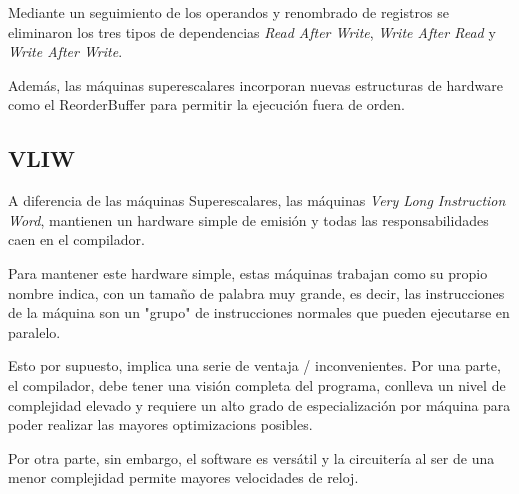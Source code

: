 \bigskip
Mediante un seguimiento de los operandos y renombrado de registros se eliminaron los tres tipos 
de dependencias \textit{Read After Write}, \textit{Write After Read} y \textit{Write After Write}. 

\bigskip
Además, las máquinas superescalares incorporan nuevas estructuras de hardware como el ReorderBuffer para
permitir la ejecución fuera de orden.

\subsection{VLIW}

A diferencia de las máquinas Superescalares, las máquinas \textit{Very Long Instruction Word},
mantienen un hardware simple de emisión y todas las responsabilidades caen en el compilador.

\bigskip
Para mantener este hardware simple, estas máquinas trabajan como su propio nombre indica, con
un tamaño de palabra muy grande, es decir, las instrucciones de la máquina son un "grupo"
de instrucciones normales que pueden ejecutarse en paralelo.

\bigskip
Esto por supuesto, implica una serie de ventaja / inconvenientes. Por una parte, el compilador,
debe tener una visión completa del programa, conlleva un nivel de complejidad elevado y requiere
un alto grado de especialización por máquina para poder realizar las mayores optimizacions posibles.

\bigskip
Por otra parte, sin embargo, el software es versátil y la circuitería al ser de una menor complejidad 
permite mayores velocidades de reloj.